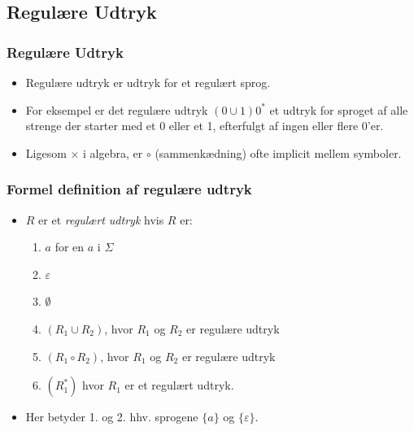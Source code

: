 \subsection{Regulære Udtryk}%
\label{subsec:regulæreudtryk}

\begin{frame}
	\frametitle{Regulære Udtryk}
	\begin{itemize}
		\item Regulære udtryk er udtryk for et regulært sprog.
		\item For eksempel er det regulære udtryk $(0 \cup 1)0^{*}$ et udtryk for sproget af alle strenge der starter med et 0 eller et 1, efterfulgt af ingen eller flere 0'er.
		\item Ligesom $\times$ i algebra, er $\circ$ (sammenkædning) ofte implicit mellem symboler.
	\end{itemize}
\end{frame}

\begin{frame}[allowframebreaks]
	\frametitle{Formel definition af regulære udtryk}
	\begin{itemize}
		\item $R$ er et \textit{regulært udtryk} hvis $R$ er:
		      \begin{enumerate}
			      \item $a$ for en $a$ i $\Sigma$
			      \item $\varepsilon$
			      \item $\emptyset$
			      \item $(R_{1} \cup R_{2})$, hvor $R_{1}$ og $R_{2}$ er regulære udtryk
			      \item $(R_{1} \circ R_{2})$, hvor $R_{1}$ og $R_{2}$ er regulære udtryk
			      \item $(R_{1}^{*})$ hvor $R_{1}$ er et regulært udtryk.
		      \end{enumerate}
		\item Her betyder 1. og 2. hhv. sprogene $\{a\}$ og $\{\varepsilon\}$.
	\end{itemize}
\end{frame}

